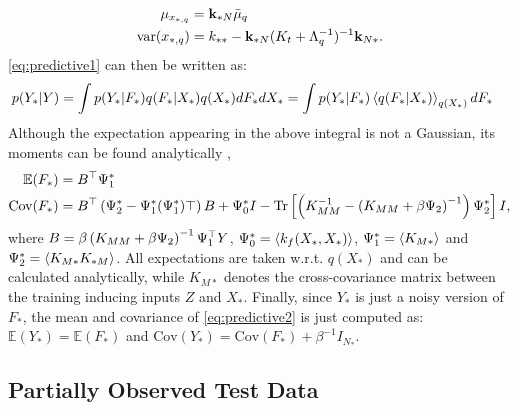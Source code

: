 \documentclass{article} %
\begin{document}
%
\begin{align}
 \mu_{x_{*,q}} = {}& \mathbf{k}_{*N} \bar{\mu}_q \\
  \text{var}(x_{*,q}) = {}& k_{**} - \mathbf{k}_{*N} (K_t + \Lambda_q^{-1})^{-1} \mathbf{k}_{N*}.
\end{align}
%
\eqref{eq:predictive1} can then be written as:
\begin{align} 
p(Y_*| Y) {}& =  \int p(Y_*| F_*)  q(F_*|X_*) q(X_*) d F_* d X_* = \int p(Y_* | F_*) \left\langle q(F_* | X_*) \right\rangle_{q(X_*)} d F_* \label{eq:predictive2}
\end{align}
%
Although the expectation appearing in the above integral is not a Gaussian, its moments can be found analytically \cite{rasmussen-williams, Girard03gaussianprocess},
%
\begin{align}
 \mathbb{E}(F_*) ={}&  B^{\top} \Psi_1^* \label{meanFstar} \\
 \text{Cov}(F_*) ={}& B^{\top} \left( \Psi_2^* - \Psi_1^* (\Psi_1^*){\top} \right) B + \Psi_0^* I - \text{Tr} \left[ \left( K_{MM}^{-1} - \left( K_{MM} + \beta \Psi_2 \right)^{-1} \right) \Psi_2^* \right] I,
\end{align}
%
where $B = \beta \left( K_{MM} + \beta \Psi_2 \right)^{-1} \Psi_1^{\top}
Y$, $\Psi_0^* = \left\langle k_f(X_*, X_*) \right\rangle$, $\Psi_1^* = \left\langle K_{M*} \right\rangle$
and $\Psi_2^* = \left\langle K_{M*} K_{*M} \right\rangle$. All expectations are taken
w.r.t. $q(X_*)$ and can be calculated analytically, while $K_{M*}$
denotes the cross-covariance matrix between the training inducing
inputs $Z$ and $X_*$. Finally, since $Y_*$ is just a noisy version of
$F_*$, the mean and covariance of \eqref{eq:predictive2} is just
computed as: $\mathbb{E}(Y_*) = \mathbb{E}(F_*)$ and $\text{Cov}(Y_*)
= \text{Cov}(F_*) + \beta^{-1} I_{N_*}$.


\subsection{Partially Observed Test Data}
\end{document}
